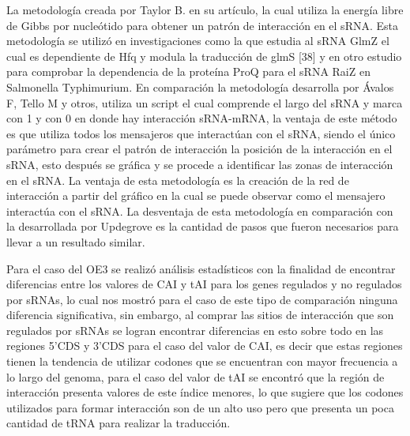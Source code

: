 La metodolog\'ia creada por Taylor B. en su art\'iculo\cite{Updegrove2015}, la cual utiliza la energ\'ia libre de Gibbs por nucle\'otido para obtener un patr\'on de interacci\'on en el sRNA. Esta metodolog\'ia se utiliz\'o en investigaciones como la que estudia al sRNA GlmZ el cual es dependiente de Hfq y modula la traducci\'on de glmS [38] y en otro estudio para comprobar la dependencia de la prote\'ina ProQ para el sRNA RaiZ en Salmonella Typhimurium\cite{Smirnov2017}. En comparaci\'on la metodolog\'ia desarrolla por \'Avalos F, Tello M y otros, utiliza un script el cual comprende el largo del sRNA y marca con 1 y con 0 en donde hay interacci\'on sRNA-mRNA, la ventaja de este m\'etodo es que utiliza todos los mensajeros que interact\'uan con el sRNA, siendo el \'unico par\'ametro para crear el patr\'on de interacci\'on la posici\'on de la interacci\'on en el sRNA, esto despu\'es se gr\'afica y se procede a identificar las zonas de interacci\'on en el sRNA. La ventaja de esta metodolog\'ia es la creaci\'on de la red de interacci\'on a partir del gr\'afico en la cual se puede observar como el mensajero interact\'ua con el sRNA. La desventaja de esta metodolog\'ia en comparaci\'on con la desarrollada por Updegrove es la cantidad de pasos que fueron necesarios para llevar a un resultado similar.

Para el caso del OE3 se realiz\'o an\'alisis estad\'isticos con la finalidad de encontrar diferencias entre los valores de CAI y tAI para los genes regulados y no regulados por sRNAs, lo cual nos mostr\'o para el caso de este tipo de comparaci\'on ninguna diferencia significativa, sin embargo, al comprar las sitios de interacci\'on que son regulados por sRNAs se logran encontrar diferencias en esto sobre todo en las regiones 5'CDS y 3'CDS para el caso del valor de CAI, es decir que estas regiones tienen la tendencia de utilizar codones que se encuentran con mayor frecuencia a lo largo del genoma, para el caso del valor de tAI se encontr\'o que la regi\'on de interacci\'on presenta valores de este \'indice menores, lo que sugiere que los codones utilizados para formar interacci\'on son de un alto uso pero que presenta un poca cantidad de tRNA para realizar la traducci\'on.

